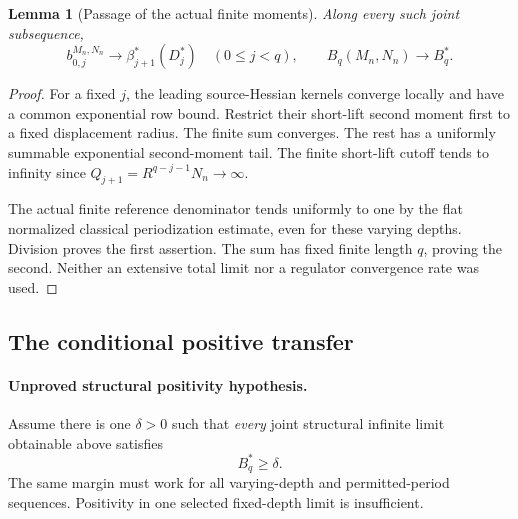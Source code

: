 \documentclass[11pt]{article}
\newtheorem{lemma}[theorem]{Lemma}
\theoremstyle{remark}
\begin{document}
\begin{lemma}[Passage of the actual finite moments]
\label{fbt-moment-lemma}
Along every such joint subsequence,
\begin{equation}
 b_{0,j}^{M_n,N_n}\longrightarrow
                      \beta_{j+1}^*(D_j^*)\quad(0\le j<q),
 \qquad
 B_q(M_n,N_n)\longrightarrow B_q^*.
 \label{fbt-moment-limits}
\end{equation}
\end{lemma}
\begin{proof}
For a fixed \(j\), the leading source-Hessian kernels
converge locally and have a common exponential row
bound. Restrict their short-lift second moment first
to a fixed displacement radius. The finite sum converges.
The rest has a uniformly summable exponential
second-moment tail. The finite short-lift cutoff tends
to infinity since \(Q_{j+1}=R^{q-j-1}N_n\to\infty\).

The actual finite reference denominator tends uniformly
to one by the flat normalized classical periodization
estimate, even for these varying depths. Division proves
the first assertion. The sum has fixed finite length
\(q\), proving the second. Neither an extensive total
limit nor a regulator convergence rate was used.
\end{proof}

\subsection{The conditional positive transfer}
\label{fbt-positive-section}

\paragraph{Unproved structural positivity hypothesis.}
Assume there is one \(\delta>0\) such that \emph{every}
joint structural infinite limit obtainable above satisfies
\begin{equation}
                                  B_q^*\ge\delta.
 \label{fbt-positive-hypothesis}
\end{equation}
The same margin must work for all varying-depth and
permitted-period sequences. Positivity in one selected
fixed-depth limit is insufficient.
\end{document}
